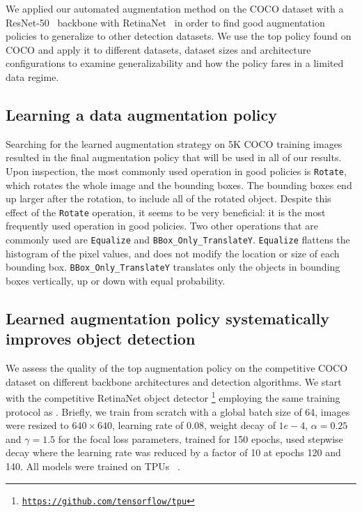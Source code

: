 \documentclass[10pt,twocolumn,letterpaper]{article}
\newcommand{\cmd}[1]{{\tt #1}}
\begin{document}
We applied our automated augmentation method on the COCO dataset with a ResNet-50~\cite{he2016deep} backbone with RetinaNet~\cite{lin2017focal} in order to find good augmentation policies to generalize to other detection datasets. We  use the top policy found on COCO and apply it to different datasets, dataset sizes and architecture configurations to examine generalizability and how the policy fares in a limited data regime. 

\subsection{Learning a data augmentation policy}

Searching for the learned augmentation strategy on 5K COCO training images resulted in the final augmentation policy that will be used in all of our results. Upon inspection, the most commonly used operation in good policies is \cmd{Rotate}, which rotates the whole image and the bounding boxes. The bounding boxes end up larger after the rotation, to include all of the rotated object. Despite this effect of the \cmd{Rotate} operation, it seems to be very beneficial: it is the most frequently used operation in good policies. Two other operations that are commonly used are \cmd{Equalize} and \cmd{BBox\_Only\_TranslateY}. \cmd{Equalize} flattens the histogram of the pixel values, and does not modify the location or size of each bounding box. \cmd{BBox\_Only\_TranslateY} translates only the objects in bounding boxes vertically, up or down with equal probability.


\subsection{Learned augmentation policy systematically improves object detection}
We assess the quality of the top augmentation policy on the competitive COCO dataset \cite{lin2014microsoft} on different backbone architectures and detection algorithms. We start with the competitive RetinaNet object detector
\footnote{{\texttt{\href{}{https://github.com/tensorflow/tpu}}}}
employing the same training protocol as \cite{ghiasi2018dropblock}. Briefly, we train from scratch with a global batch size of 64, images were resized to $640 \times 640$, learning rate of 0.08, weight decay of $1e-4$, $\alpha=0.25$ and $\gamma=1.5$ for the focal loss parameters, trained for 150 epochs, used stepwise decay where the learning rate was reduced by a factor of 10 at epochs 120 and 140.
All models were trained on TPUs ~\cite{jouppi2017datacenter}.
\end{document}
